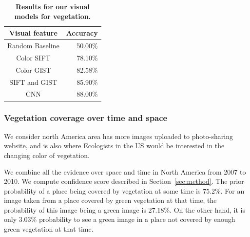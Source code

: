 
\begin{table}\centering
{}
\caption {\textbf{Results for our  visual models for vegetation.}}
\label{tab:veg_img_classifier} 
\begin{tabular}{@{}cr@{}}\toprule
Visual feature &  Accuracy\\\midrule
Random Baseline & 50.00\%\\
Color SIFT & 78.10\%\\
Color GIST & 82.58\% \\
SIFT and GIST& 85.90\% \\
CNN &  88.00\%\\
\bottomrule
\end{tabular}
\end{table}


\subsubsection{Vegetation coverage over time and space}
We consider north America area has more images uploaded to photo-sharing website, and is also where Ecologists in the US would be interested in the changing color of vegetation. 


We combine all the evidence over space and time in North America from 2007 to 2010. We compute confidence score described in Section~\ref{sec:method}. 
The prior probability of a place being covered by vegetation at some time is 75.2\%.
For an image taken from a place covered by green vegetation at that time, the probability of this image being a green image is 27.18\%. On the other hand, it is only 3.03\% probability to see a green image in a place not covered by enough green vegetation at that time.

